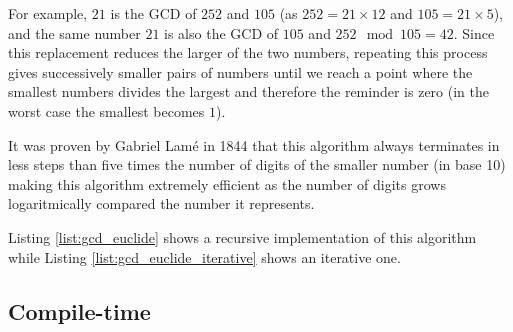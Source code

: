 For example, $21$ is the GCD of $252$ and $105$ (as $252 = 21 \times 12$ and $105 = 21 \times 5$), and the same number $21$ is also the GCD of $105$ and $252 \mod 105 = 42$.
Since this replacement reduces the larger of the two numbers, repeating this process gives successively smaller pairs of numbers until we reach a point where the smallest numbers divides the largest and therefore the reminder is zero (in the worst case the smallest becomes $1$). 

It was proven by Gabriel Lamé in 1844 that this algorithm always terminates in less steps than five times the number of digits of the smaller number (in base 10) making this algorithm extremely efficient as the number of digits grows logaritmically compared the number it represents.

Listing \ref{list:gcd_euclide} shows a recursive implementation of this algorithm while Listing \ref{list:gcd_euclide_iterative} shows an iterative one. 





\subsection{\CC Compile-time}

